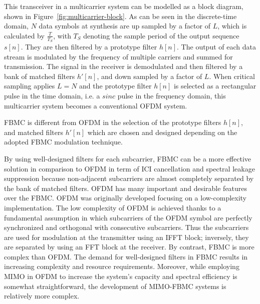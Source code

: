 This transceiver in a multicarrier system can be modelled as a block diagram, shown in Figure~\ref{fig:multicarrier-block}.
As can be seen in the discrete-time domain, $N$ data symbols at synthesis are up sampled by a factor of $L$, which is calculated by $\frac{T}{T_{S}}$, with $T_{S}$ denoting the sample period of the output sequence $s[n]$. They are then filtered by a prototype filter $h[n]$. The output of each data stream is modulated by the frequency of multiple carriers and summed for transmission.
The signal in the receiver is demodulated and then filtered by a bank of matched filters $h'[n]$, and down sampled by a factor of $L$.
When critical sampling applies $L = N$ and the prototype filter $h[n]$ is selected as a rectangular pulse in the time domain, i.e. a $sinc$ pulse in the frequency domain, this multicarrier system becomes a conventional OFDM system.

FBMC is different from OFDM in the selection of the prototype filters $h[n]$, and matched filters $h'[n]$ which are chosen and designed depending on the adopted FBMC modulation technique.

By using well-designed filters for each subcarrier, FBMC can be a more effective solution in comparison to OFDM in term of ICI cancellation and spectral leakage suppression because non-adjacent subcarriers are almost completely separated by the bank of matched filters.
OFDM has many important and desirable features over the FBMC. OFDM was originally developed focusing on a low-complexity implementation. The low complexity of OFDM is achieved thanks to a fundamental assumption in which subcarriers of the OFDM symbol are perfectly synchronized and orthogonal with consecutive subcarriers. Thus the subcarriers are used for modulation at the transmitter using an IFFT block; inversely, they are separated by using an FFT block at the receiver. By contrast, FBMC is more complex than OFDM. The demand for well-designed filters in FBMC results in increasing complexity and resource requirements.
Moreover, while employing MIMO in OFDM to increase the system's capacity and spectral efficiency is somewhat straightforward, the development of MIMO-FBMC systems is relatively more complex.

